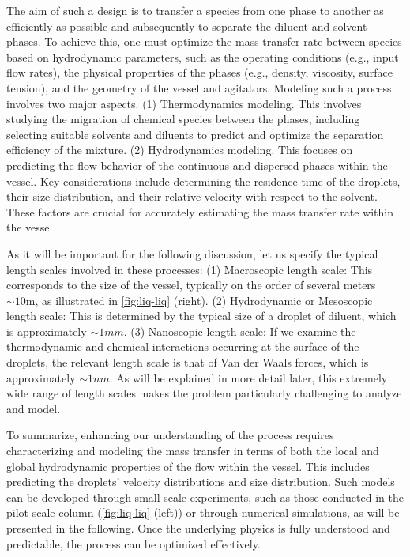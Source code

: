 The aim of such a design is to transfer a species from one phase to another as efficiently as possible and subsequently to separate the diluent and solvent phases.
To achieve this, one must optimize the mass transfer rate between species based on hydrodynamic parameters, such as the operating conditions (e.g., input flow rates), the physical properties of the phases (e.g., density, viscosity, surface tension), and the geometry of the vessel and agitators.
Modeling such a process involves two major aspects.
(1) Thermodynamics modeling. This involves studying the migration of chemical species between the phases, including selecting suitable solvents and diluents to predict and optimize the separation efficiency of the mixture.
(2) Hydrodynamics modeling. This focuses on predicting the flow behavior of the continuous and dispersed phases within the vessel. Key considerations include determining the residence time of the droplets, their size distribution, and their relative velocity with respect to the solvent. These factors are crucial for accurately estimating the mass transfer rate within the vessel



As it will be important for the following discussion, let us specify the typical length scales involved in these processes:
(1) Macroscopic length scale: This corresponds to the size of the vessel, typically on the order of several meters $\sim 10 \text{m}$, as illustrated in \ref{fig:liq-liq} (right). 
(2) Hydrodynamic or Mesoscopic length scale: This is determined by the typical size of a droplet of diluent, which is approximately $\sim 1 mm$. 
(3) Nanoscopic length scale: If we examine the thermodynamic and chemical interactions occurring at the surface of the droplets, the relevant length scale is that of Van der Waals forces, which is approximately $\sim 1 nm$. 
As will be explained in more detail later, this extremely wide range of length scales makes the problem particularly challenging to analyze and model. 

To summarize, enhancing our understanding of the process requires characterizing and modeling the mass transfer in terms of both the local and global hydrodynamic properties of the flow within the vessel. 
This includes predicting the droplets' velocity distributions and size distribution. 
Such models can be developed through small-scale experiments, such as those conducted in the pilot-scale column (\ref{fig:liq-liq} (left)) or through numerical simulations, as will be presented in the following. 
Once the underlying physics is fully understood and predictable, the process can be optimized effectively.


